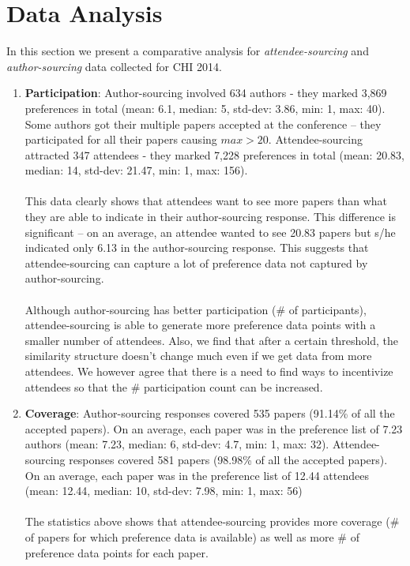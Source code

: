\documentclass[letterpaper]{article}
\begin{document}
\section{Data Analysis}
In this section we present a comparative analysis for \emph{attendee-sourcing} and \emph{author-sourcing} data collected for CHI 2014. 
\begin{enumerate}
\item \textbf{Participation}: Author-sourcing involved 634 authors - they marked 3,869 preferences in total (mean: 6.1, median: 5, std-dev: 3.86, min: 1, max: 40). Some authors got their multiple papers accepted at the conference -- they participated for all their papers causing  $max > 20$. Attendee-sourcing attracted 347 attendees - they marked 7,228 preferences in total (mean: 20.83, median: 14, std-dev: 21.47, min: 1, max: 156).
\\
\\
This data clearly shows that attendees want to see more papers than what they are able to indicate in their author-sourcing response. This difference is significant -- on an average, an attendee wanted to see 20.83 papers but s/he indicated only 6.13 in the author-sourcing response. This suggests that attendee-sourcing can capture a lot of preference data not captured by author-sourcing.
\\
\\
Although author-sourcing has better participation (\# of participants), attendee-sourcing is able to generate more preference data points with a smaller number of attendees. Also, we find that after a certain threshold, the similarity structure doesn't change much even if we get data from more attendees. We however agree that there is a need to find ways to incentivize attendees so that the \# participation count can be increased.

\item \textbf{Coverage}: Author-sourcing responses covered 535 papers (91.14\% of all the accepted papers). On an average, each paper was in the preference list of 7.23 authors (mean: 7.23, median: 6, std-dev: 4.7, min: 1, max: 32). Attendee-sourcing responses covered 581 papers (98.98\% of all the accepted papers). On an average, each paper was in the preference list of 12.44 attendees (mean: 12.44, median: 10, std-dev: 7.98, min: 1, max: 56)
\\
\\
The statistics above shows that attendee-sourcing provides more coverage (\# of papers for which preference data is available) as well as more \# of preference data points for each paper.


\end{enumerate}
\end{document}
